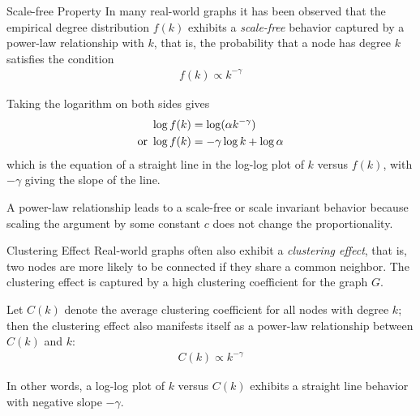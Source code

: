 \begin{frame}{Scale-free Property}
In many real-world graphs it has been observed that the
empirical degree
distribution $f(k)$ exhibits a {\em scale-free} behavior captured
by a power-law relationship with $k$, that is, the probability that
a node has degree $k$ satisf\/{i}es the condition
\begin{align*}
    f(k) \propto k^{-\gamma}
\end{align*}

\medskip


\medskip
Taking the logarithm on both sides gives
\begin{align*}
    \log f(k) & = \log (\alpha k^{-\gamma}) \notag\\
    \text{or } \log f(k) & = - \gamma \log k + \log \alpha
\end{align*}
which is the equation of a
straight line in the log-log plot of $k$ versus $f(k)$, with
$-\gamma$ giving the slope of the line. 

\medskip
A power-law relationship leads to a
scale-free or scale invariant
behavior because scaling the argument by some constant $c$
does not change the
proportionality.


\end{frame}


\begin{frame}{Clustering Effect}
Real-world graphs often also exhibit a {\em clustering effect}, that is,
two nodes are more likely to be connected if they share a common
neighbor. The clustering effect is captured by a high clustering
coeff\/{i}cient for the graph $G$. 

\medskip
Let $C(k)$ denote the \hbox{average}
clustering coeff\/{i}cient for all nodes with degree $k$; then the
clustering effect also manifests itself as a power-law
relationship between $C(k)$ and $k$:
\begin{align*}
    C(k) \propto k^{-\gamma}
\end{align*}

In other words, a log-log plot of $k$ versus $C(k)$ exhibits
a straight line behavior with negative slope $-\gamma$.

\end{frame}


